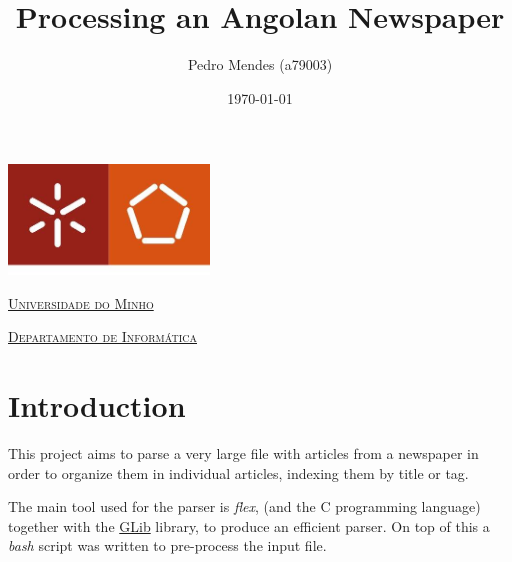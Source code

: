 \documentclass[a4paper]{article}
\begin{document}
\title{Processing an Angolan Newspaper}
\author{Pedro Mendes (a79003)}
\date{\today}

\begin{titlepage}
    \thispagestyle{empty}
    \begin{center}
        \begin{minipage}{0.75\linewidth}
            \centering
            \includegraphics[width=0.4\textwidth]{eng.jpeg}\par\vspace{1cm}
            \vspace{1.5cm}
            \href{https://www.uminho.pt/PT}
            {\scshape\LARGE Universidade do Minho} \par
            \vspace{1cm}
            \href{https://www.di.uminho.pt/}
            {\scshape\Large Departamento de Informática} \par
            \vspace{1.5cm}

            \maketitle
        \end{minipage}
    \end{center}

\end{titlepage}

\tableofcontents

\pagebreak

\section{Introduction}
This project aims to parse a very large file with articles from a newspaper in
order to organize them in individual articles, indexing them by title or tag.

The main tool used for the parser is \textit{flex}, (and the C programming
language) together with the \href{https://developer.gnome.org/}{GLib} library,
to produce an efficient parser. On top of this a \textit{bash} script was
written to pre-process the input file.
\end{document}
